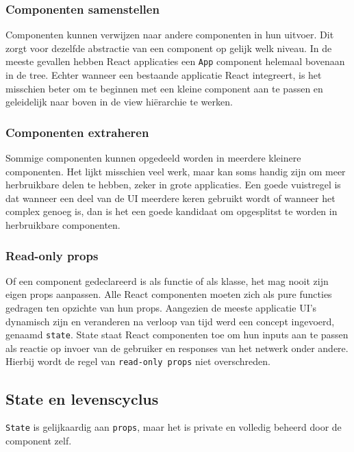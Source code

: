 \subsubsection{Componenten samenstellen}

Componenten kunnen verwijzen naar andere componenten in hun uitvoer. Dit zorgt voor dezelfde abstractie van een component op gelijk welk niveau. In de meeste gevallen hebben React applicaties een \texttt{App} component helemaal bovenaan in de tree. Echter wanneer een bestaande applicatie React integreert, is het misschien beter om te beginnen met een kleine component aan te passen en geleidelijk naar boven in de view hiërarchie te werken. \autocite{React2019b}

\subsubsection{Componenten extraheren} \label{componenten extraheren}

Sommige componenten kunnen opgedeeld worden in meerdere kleinere componenten. Het lijkt misschien veel werk, maar kan soms handig zijn om meer herbruikbare delen te hebben, zeker in grote applicaties. Een goede vuistregel is dat wanneer een deel van de UI meerdere keren gebruikt wordt of wanneer het complex genoeg is, dan is het een goede kandidaat om opgesplitst te worden in herbruikbare componenten.  \autocite{React2019b}

\subsubsection{Read-only props}

Of een component gedeclareerd is als functie of als klasse, het mag nooit zijn eigen props aanpassen. Alle React componenten moeten zich als pure functies gedragen ten opzichte van hun props. Aangezien de meeste applicatie UI's dynamisch zijn en veranderen na verloop van tijd werd een concept ingevoerd, genaamd \texttt{state}. State staat React componenten toe om hun inputs aan te passen als reactie op invoer van de gebruiker en responses van het netwerk onder andere. Hierbij wordt de regel van \texttt{read-only props} niet overschreden. \autocite{React2019b}

\subsection{State en levenscyclus}

\texttt{State} is gelijkaardig aan \texttt{props}, maar het is private en volledig beheerd door de component zelf. \autocite{React2019c}


